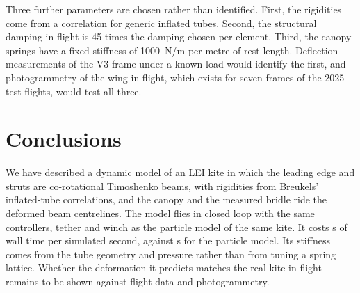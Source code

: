 \documentclass[11pt,a4paper]{article}
\begin{document}
Three further parameters are chosen rather than identified. First, the rigidities come from a correlation for generic inflated tubes. Second, the structural damping in flight is 45 times the damping chosen per element. Third, the canopy springs have a fixed stiffness of \SI{1000}{N/m} per metre of rest length. Deflection measurements of the V3 frame under a known load would identify the first, and photogrammetry of the wing in flight, which exists for seven frames of the 2025 test flights, would test all three.

\section{Conclusions}

We have described a dynamic model of an LEI kite in which the leading edge and struts are co-rotational Timoshenko beams, with rigidities from Breukels' inflated-tube correlations, and the canopy and the measured bridle ride the deformed beam centrelines. The model flies in closed loop with the same controllers, tether and winch as the particle model of the same kite. It costs \CostPerSecondBeam{} s of wall time per simulated second, against \CostPerSecondPsm{} s for the particle model. Its stiffness comes from the tube geometry and pressure rather than from tuning a spring lattice. Whether the deformation it predicts matches the real kite in flight remains to be shown against flight data and photogrammetry.



\end{document}
